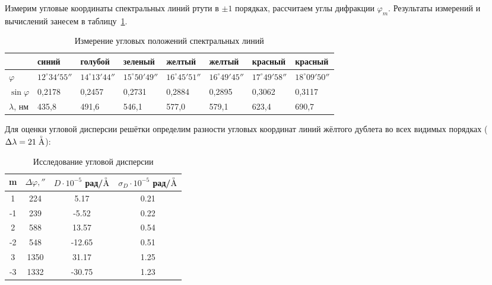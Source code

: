 \documentclass[a4paper,12pt]{article} %
\begin{document}
Измерим угловые координаты спектральных линий ртути в $ \pm1 $ порядках, рассчитаем углы дифракции $\varphi_m$. Результаты измерений и вычислений занесем в таблицу~\ref{table:exp1}.
		\begin{table}[H]
			\caption{Измерение угловых положений спектральных линий}
			\label{table:exp1}
			\begin{center}
			    \begin{tabular}{|p{2.2cm}|p{1.5cm}|p{1.5cm}|p{1.5cm}|p{1.5cm}|p{1.5cm}|p{1.5cm}|p{1.5cm}|}
				\hline
				 & синий  & голубой & зеленый & желтый & желтый & красный & красный \\ \hline
				$ \varphi $&  $12^{\circ}34'55'' $& $14^{\circ}13'44''$ & $15^{\circ}50'49'' $& $16^{\circ}45'51'' $& $16^{\circ}49'45''$ & $17^{\circ}49'58'' $& $18^{\circ}09'50''$ \\ \hline
				$\sin \varphi$   & 0,2178 & 0,2457  & 0,2731  & 0,2884 & 0,2895 & 0,3062  & 0,3117  \\ \hline
				$ \lambda $, нм   & 435,8  & 491,6   & 546,1   & 577,0    & 579,1  & 623,4   & 690,7   \\ \hline
			\end{tabular}
			\end{center}
			
		\end{table}
		Для оценки угловой дисперсии решётки определим разности угловых координат линий жёлтого дублета во всех видимых порядках ($ \Delta \lambda = 21  \buildrel _{\circ} \over {\mathrm{A}} $):

		\begin{table}[H]
    \centering
    \begin{tabular}{|c|c|c|c|}
    \hline
    m  & $\Delta\varphi, ''$  & $D\cdot10^{-5}$ рад/$\buildrel _{\circ} \over {\mathrm{A}}$    & $\sigma_D\cdot10^{-5}$ рад/$\buildrel _{\circ} \over {\mathrm{A}}$ \\ \hline
    1  & 224  & 5.17   & 0.21  \\ \hline
    -1 & 239  & -5.52  & 0.22  \\ \hline
    2  & 588  & 13.57  & 0.54  \\ \hline
    -2 & 548  & -12.65 & 0.51  \\ \hline
    3  & 1350 & 31.17  & 1.25  \\ \hline
    -3 & 1332 & -30.75 & 1.23  \\ \hline
    \end{tabular}
    \caption{Исследование угловой дисперсии}
    \label{tab:disp}
\end{table}
	
\end{document}
